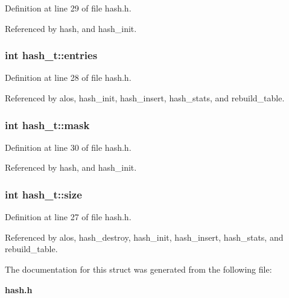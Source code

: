 Definition at line 29 of file hash.h.

Referenced by hash, and hash\_\-init.
\subsubsection{\setlength{\rightskip}{0pt plus 5cm}int hash\_\-t::entries}\label{structhash__t_m2}




Definition at line 28 of file hash.h.

Referenced by alos, hash\_\-init, hash\_\-insert, hash\_\-stats, and rebuild\_\-table.
\subsubsection{\setlength{\rightskip}{0pt plus 5cm}int hash\_\-t::mask}\label{structhash__t_m4}




Definition at line 30 of file hash.h.

Referenced by hash, and hash\_\-init.
\subsubsection{\setlength{\rightskip}{0pt plus 5cm}int hash\_\-t::size}\label{structhash__t_m1}




Definition at line 27 of file hash.h.

Referenced by alos, hash\_\-destroy, hash\_\-init, hash\_\-insert, hash\_\-stats, and rebuild\_\-table.

The documentation for this struct was generated from the following file:\begin{CompactItemize}
\item 
{\bf hash.h}\end{CompactItemize}
